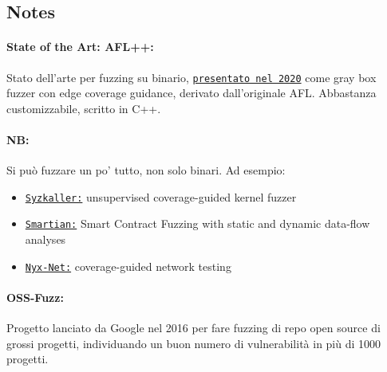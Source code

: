 \newpage

\subsection*{Notes}

\paragraph{State of the Art: AFL++:} Stato dell'arte per fuzzing su binario, \href{https://www.usenix.org/system/files/woot20-paper-fioraldi.pdf}{\texttt{presentato nel 2020}} come gray box fuzzer con edge coverage guidance, derivato dall'originale AFL. Abbastanza customizzabile, scritto in C++. \\

\paragraph{NB:} Si può fuzzare un po' tutto, non solo binari. Ad esempio:
\begin{itemize}
	\item \href{https://github.com/google/syzkaller}{\texttt{Syzkaller:}} unsupervised coverage-guided kernel fuzzer
	\item \href{https://softsec.kaist.ac.kr/~sangkilc/papers/choi-ase2021.pdf}{\texttt{Smartian:}} Smart Contract Fuzzing with static and dynamic data-flow analyses
	\item \href{https://dl.acm.org/doi/pdf/10.1145/3492321.3519591}{\texttt{Nyx-Net:}} coverage-guided network testing
\end{itemize}

\paragraph{OSS-Fuzz:} Progetto lanciato da Google nel 2016 per fare fuzzing di repo open source di grossi progetti, individuando un buon numero di vulnerabilità in più di 1000 progetti.\\


